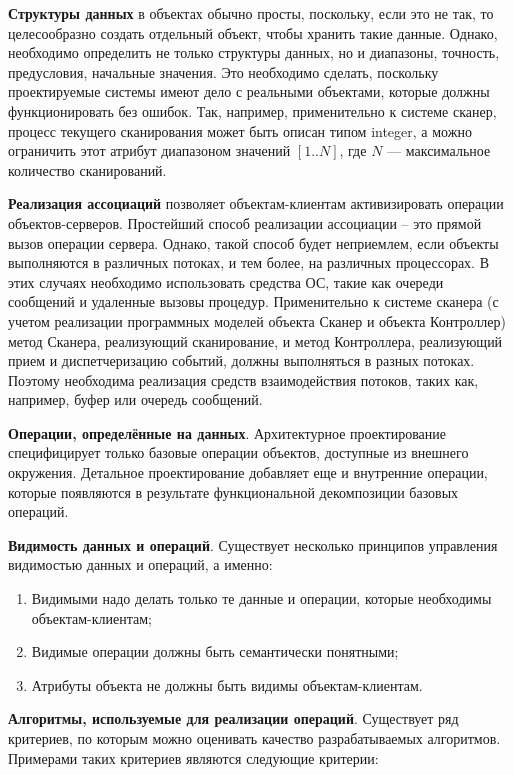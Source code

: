\documentclass[12pt]{article}
\begin{document}
    \textbf{Структуры данных} в объектах обычно просты, поскольку, если это не так, то целесообразно создать отдельный объект, чтобы хранить такие данные. Однако, необходимо определить не только структуры данных, но и диапазоны, точность, предусловия, начальные значения. Это необходимо сделать, поскольку проектируемые системы имеют дело с реальными объектами, которые должны функционировать без ошибок. Так, например, применительно к системе сканер, процесс текущего сканирования может быть описан типом integer, а можно ограничить этот атрибут диапазоном значений $[1..N]$, где $N$ --- максимальное количество сканирований.

    \textbf{Реализация ассоциаций} позволяет объектам-клиентам активизировать операции объектов-серверов. Простейший способ реализации ассоциации – это прямой вызов операции сервера. Однако, такой способ будет неприемлем, если объекты выполняются в различных потоках, и тем более, на различных процессорах. В этих случаях необходимо использовать средства ОС, такие как очереди сообщений и удаленные вызовы процедур. Применительно к системе сканера (с учетом реализации программных моделей объекта Сканер и объекта Контроллер) метод Сканера, реализующий сканирование, и метод Контроллера, реализующий прием и диспетчеризацию событий, должны выполняться в разных потоках. Поэтому необходима реализация средств взаимодействия потоков, таких как, например, буфер или очередь сообщений.

    \textbf{Операции, определённые на данных}. Архитектурное проектирование специфицирует только базовые операции объектов, доступные из внешнего окружения. Детальное проектирование добавляет еще и внутренние операции, которые появляются в результате функциональной декомпозиции базовых операций.

    \textbf{Видимость данных и операций}. Существует несколько принципов управления видимостью данных и операций, а именно:

    \begin{enumerate}
        \item Видимыми надо делать только те данные и операции, которые необходимы объектам-клиентам;
        \item Видимые операции должны быть семантически понятными;
        \item Атрибуты объекта не должны быть видимы объектам-клиентам.
    \end{enumerate}

    \newpage

    \textbf{Алгоритмы, используемые для реализации операций}. Существует ряд критериев, по которым можно оценивать качество разрабатываемых алгоритмов. Примерами таких критериев являются следующие критерии:
\end{document}
